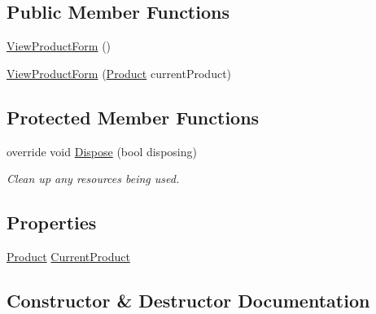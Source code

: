 \subsection*{Public Member Functions}
\begin{DoxyCompactItemize}
\item 
\hyperlink{class_health___assignment_1_1_view_product_form_a2de2b6129c6642c413e7a6e863f23e5d}{View\+Product\+Form} ()
\item 
\hyperlink{class_health___assignment_1_1_view_product_form_aa43a2379c02271c50c75a8583369c10f}{View\+Product\+Form} (\hyperlink{class_health___assignment_1_1_product}{Product} current\+Product)
\end{DoxyCompactItemize}
\subsection*{Protected Member Functions}
\begin{DoxyCompactItemize}
\item 
override void \hyperlink{class_health___assignment_1_1_view_product_form_a9f3442ce27d694020e8e80a8cebff96f}{Dispose} (bool disposing)
\begin{DoxyCompactList}\small\item\em Clean up any resources being used. \end{DoxyCompactList}\end{DoxyCompactItemize}
\subsection*{Properties}
\begin{DoxyCompactItemize}
\item 
\hyperlink{class_health___assignment_1_1_product}{Product} \hyperlink{class_health___assignment_1_1_view_product_form_ae3c9a63cd83ddf0398e752ee2f5f08e3}{Current\+Product}
\end{DoxyCompactItemize}


\subsection{Constructor \& Destructor Documentation}
\mbox{\label{class_health___assignment_1_1_view_product_form_a2de2b6129c6642c413e7a6e863f23e5d}} 
